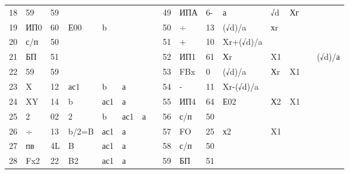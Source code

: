 \documentclass[11pt,a4paper,oneside]{article}
\begin{document}
\begin{table}[]
\begin{tabular}{|l|l|l|l|l|l|l|l|l|l|l|l|l|l|l|l|}
18    & 59      & 59  &        &     &     &   &    & 49    & ИПА                                                          & 6-  & а                                                             & √d  & Хг &   &        \\
19    & ИП0     & 60  & Е00    & b   &     &   &    & 50    & ÷                                                            & 13  & (√d)/a                                                        & хr  &    &   &        \\
20    & с/п     & 50  &        &     &     &   &    & 51    & +                                                            & 10  & Xr+(√d)/a                                                     &     &    &   &        \\
21    & БП      & 51  &        &     &     &   &    & 52    & ИП1                                                          & 61  & Хr                                                            & X1  &    &   & (√d)/а \\
22    & 59      & 59  &        &     &     &   &    & 53    & FBx                                                          & 0   & (√d)/a                                                        & Хr  & X1 &   &        \\
23    & X       & 12  & ас1    & b   & а   &   &    & 54    & -                                                            & 11  & Xr-(√d)/a &     &    &   &        \\
24    & XY      & 14  & b      & ас1 & а   &   &    & 55    & ИП4                                                          & 64  & Е02                                                           & Х2  & X1 &   &        \\
25    & 2       & 02  & 2      & b   & ас1 & а &    & 56    & с/п                                                          & 50  &                                                               &     &    &   &        \\
26    & ÷       & 13  & b/2=B  & ас1 & а   &   &    & 57    & FO                                                           & 25  & х2                                                            & X1  &    &   &        \\
27    & пв      & 4L  & B      & ас1 & а   &   &    & 58    & с/п                                                          & 50  &                                                               &     &    &   &        \\
28    & Fx2     & 22  & B2     & ас1 & а   &   &    & 59    & БП                                                           & 51  &                                                               &     &    &   &        \\

\end{tabular}
\end{table}
\end{document}
